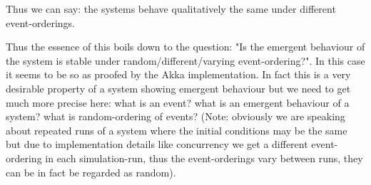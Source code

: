 Thus we can say: the systems behave qualitatively the same under different event-orderings.

Thus the essence of this boils down to the question: "Is the emergent behaviour of the system is stable under random/different/varying event-ordering?". In this case it seems to be so as proofed by the Akka implementation. In fact this is a very desirable property of a system showing emergent behaviour but we need to get much more precise here: what is an event? what is an emergent behaviour of a system? what is random-ordering of events? (Note: obviously we are speaking about repeated runs of a system where the initial conditions may be the same but due to implementation details like concurrency we get a different event-ordering in each simulation-run, thus the event-orderings vary between runs, they can be in fact be regarded as random).
